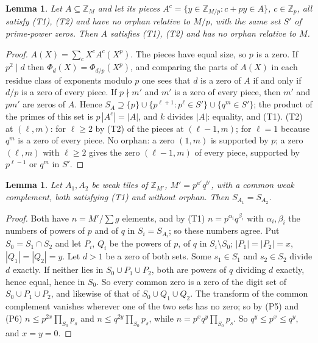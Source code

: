 \documentclass[11pt,a4paper]{amsart}
\newtheorem{lemma}[theorem]{Lemma}
\theoremstyle{definition}
\theoremstyle{remark}
\newcommand{\Z}{\mathbb{Z}}
\begin{document}
\begin{lemma}\label{lem:C}
Let $A\subseteq\Z_M$ and let its pieces $A^c=\{y\in\Z_{M/p}:c+py\in A\}$, $c\in\Z_p$, all satisfy
\textup{(T1)}, \textup{(T2)} and have no orphan relative to $M/p$, with the same set $S'$ of prime-power zeros.
Then $A$ satisfies \textup{(T1)}, \textup{(T2)} and has no orphan relative to $M$.
\end{lemma}

\begin{proof}
$A(X)=\sum_cX^cA^c(X^p)$. The pieces have equal size, so $p$ is a zero. If $p^2\mid d$ then
$\Phi_d(X)=\Phi_{d/p}(X^p)$, and comparing the parts of $A(X)$ in each residue class of exponents modulo $p$ one
sees that $d$ is a zero of $A$ if and only if $d/p$ is a zero of every piece. If $p\nmid m'$ and $m'$ is a zero
of every piece, then $m'$ and $pm'$ are zeros of $A$. Hence $S_A\supseteq\{p\}\cup\{p^{\ell+1}:p^\ell\in S'\}\cup
\{q^m\in S'\}$; the product of the primes of this set is $p\,|A^c|=|A|$, and $k$ divides $|A|$: equality, and
(T1). (T2) at $(\ell,m)$: for $\ell\ge2$ by (T2) of the pieces at $(\ell-1,m)$; for $\ell=1$ because $q^m$ is a
zero of every piece. No orphan: a zero $(1,m)$ is supported by $p$; a zero $(\ell,m)$ with $\ell\ge2$ gives the
zero $(\ell-1,m)$ of every piece, supported by $p^{\ell-1}$ or $q^m$ in $S'$.
\end{proof}

\begin{lemma}\label{lem:D}
Let $A_1,A_2$ be weak tiles of $\Z_{M'}$, $M'=p^{a'}q^{b'}$, with a common weak complement, both satisfying
\textup{(T1)} and without orphan. Then $S_{A_1}=S_{A_2}$.
\end{lemma}

\begin{proof}
Both have $n=M'/\sum g$ elements, and by (T1) $n=p^{\alpha_i}q^{\beta_i}$ with $\alpha_i,\beta_i$ the numbers of
powers of $p$ and of $q$ in $S_i=S_{A_i}$; so these numbers agree. Put $S_0=S_1\cap S_2$ and let $P_i$, $Q_i$ be
the powers of $p$, of $q$ in $S_i\setminus S_0$; $|P_1|=|P_2|=x$, $|Q_1|=|Q_2|=y$. Let $d>1$ be a zero of both
sets. Some $s_1\in S_1$ and $s_2\in S_2$ divide $d$ exactly. If neither lies in $S_0\cup P_1\cup P_2$, both are
powers of $q$ dividing $d$ exactly, hence equal, hence in $S_0$. So every common zero is a zero of the digit set
of $S_0\cup P_1\cup P_2$, and likewise of that of $S_0\cup Q_1\cup Q_2$. The transform of the common complement
vanishes wherever one of the two sets has no zero; so by (P5) and (P6) $n\le p^{2x}\prod_{S_0}p_s$ and
$n\le q^{2y}\prod_{S_0}p_s$, while $n=p^xq^y\prod_{S_0}p_s$. So $q^y\le p^x\le q^y$, and $x=y=0$.
\end{proof}
\end{document}
